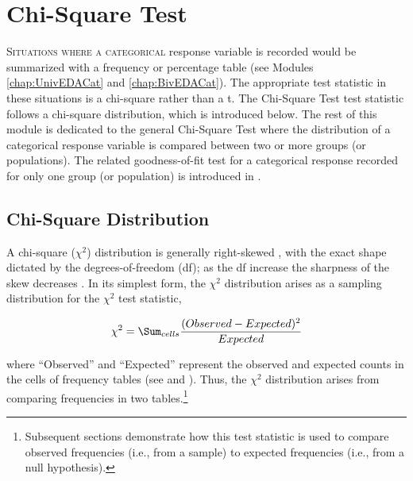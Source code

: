 \documentclass[10pt,openany]{book}\usepackage[]{graphicx}\usepackage[]{color}
\begin{document}
  \frontmatter
    

  \mainmatter




















\chapter[Chi-Square Test]{Chi-Square Test} \label{chap:ChiSquare}

\vspace{-12pt}
\minitoc

\lettrine{S}{ituations where a categorical} response variable is recorded would be summarized with a frequency or percentage table (see Modules \ref{chap:UnivEDACat} and \ref{chap:BivEDACat}). The appropriate test statistic in these situations is a chi-square rather than a t. The Chi-Square Test test statistic follows a chi-square distribution, which is introduced below. The rest of this module is dedicated to the general Chi-Square Test where the distribution of a categorical response variable is compared between two or more groups (or populations). The related goodness-of-fit test for a categorical response recorded for only one group (or population) is introduced in .

\vspace{-12pt}
\section{Chi-Square Distribution}\label{sect:ChiDist}
\vspace{-6pt}
A chi-square ($\chi^2$) distribution is generally right-skewed , with the exact shape dictated by the degrees-of-freedom (df); as the df increase the sharpness of the skew decreases . In its simplest form, the $\chi^2$ distribution arises as a sampling distribution for the $\chi^2$ test statistic,

\[ \chi^{2} = \Sum_{cells}\frac{(Observed-Expected)^{2}}{Expected} \]

where ``Observed'' and ``Expected'' represent the observed and expected counts in the cells of frequency tables (see  and ). Thus, the $\chi^2$ distribution arises from comparing frequencies in two tables.\footnote{Subsequent sections demonstrate how this test statistic is used to compare observed frequencies (i.e., from a sample) to expected frequencies (i.e., from a null hypothesis).}
\end{document}
